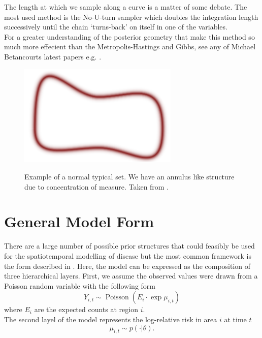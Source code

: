 \documentclass[11pt]{report}
\begin{document}
The length at which we sample along a curve is a matter of some debate. The most used method is the No-U-turn sampler which doubles the integration length successively until the chain `turns-back' on itself in one of the variables. \\

For a greater understanding of the posterior geometry that make this method so much more effecient than the Metropolis-Hastings and Gibbs, see any of Michael Betancourts latest papers e.g. \citet{geometric}.

\begin{figure}
\centering
\includegraphics[width=3in]{typical}
\label{fig:typical}
\caption{Example of a normal typical set. We have an annulus like structure due to concentration of measure. Taken from \citet{conceptual}.}
\end{figure}

\section{General Model Form}

There are a large number of possible prior structures that could feasibly be used for the spatiotemporal modelling of disease but the most common framework is the form described in \citet{best2005comparison}. Here, the model can be expressed as the composition of three hierarchical layers. First, we assume the observed values were drawn from a Poisson random variable with the following form
\begin{equation}
Y_{i,t} \sim \operatorname{Poisson}(E_i\cdot \exp{\mu_{i,t}})
\end{equation}
where $E_i$ are the expected counts at region $i$. \\

The second layel of the model represents the log-relative risk in area $i$ at time $t$
\begin{equation}
\mu_{i,t} \sim p(\cdot | \theta).
\end{equation}
\end{document}
